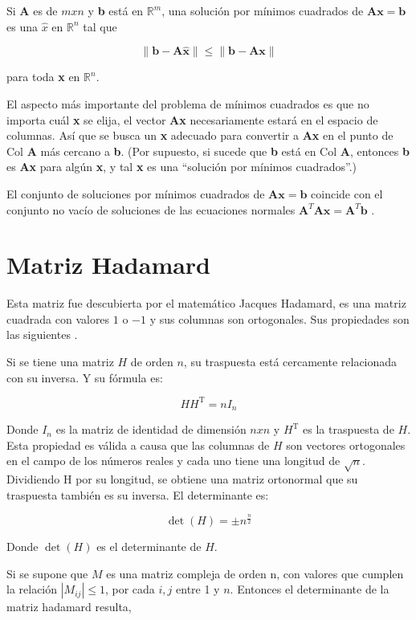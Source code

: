 Si \textbf{A} es de $m x n$ y \textbf{b} está en $\mathds{R}^m$, una solución por mínimos cuadrados de $\mathbf{Ax} = \mathbf{b}$
es una $\hat{x}$ en $\mathds{R}^n$ tal que

$$
\parallel \mathbf{b} - \mathbf{A\hat{x}}\parallel \le \parallel\mathbf{b}-\mathbf{Ax} \parallel
$$

para toda \textbf{x} en $\mathds{R}^n$.

El aspecto más importante del problema de mínimos cuadrados es que no importa cuál \textbf{x} se elija, el vector \textbf{Ax}
necesariamente estará en el espacio de columnas. Así que se busca un \textbf{x} adecuado para convertir a \textbf{Ax} en el 
punto de Col \textbf{A} más cercano a \textbf{b}. (Por supuesto, si sucede que \textbf{b} está en Col \textbf{A}, entonces 
\textbf{b} es \textbf{Ax} para algún \textbf{x}, y tal \textbf{x} es una “solución por mínimos cuadrados”.)

El conjunto de soluciones por mínimos cuadrados de $\mathbf{Ax} = \mathbf{b}$ coincide con el conjunto no vacío de soluciones
de las ecuaciones normales $\mathbf{A}^T\mathbf{Ax} = \mathbf{A}^T\mathbf{b}$ \cite{MatrixMin}.

\section{Matriz Hadamard}
Esta matriz fue descubierta por el matemático Jacques Hadamard, es una matriz cuadrada con valores $1$ o $-1$ y sus columnas 
son ortogonales. Sus propiedades son las siguientes \cite{HadamardWiki}. 

Si se tiene una matriz $H$ de orden $n$, su traspuesta está cercamente relacionada con su inversa. Y su fórmula es:

$$ H H^{\mathrm{T}} = n I_n $$

Donde $I_n$ es la matriz de identidad de dimensión $n x n$ y $H^\mathrm{T}$ es la traspuesta de $H$. Esta propiedad es válida a causa 
que las columnas de $H$ son vectores ortogonales en el campo de los números reales y cada uno tiene una longitud de $\sqrt n$.
Dividiendo H por su longitud, se obtiene una matriz ortonormal que su traspuesta también es su inversa. El determinante es:

$$ \operatorname{det}(H) = \pm n^{\frac{n}{2}} $$

Donde $\operatorname{det}(H)$ es el determinante de $H$.

Si se supone que $M$ es una matriz compleja de orden n, con valores que cumplen la relación $|M_{ij}| \le 1$, por cada $i,j$ 
entre 1 y $n$. Entonces el determinante de la matriz hadamard resulta,
		    
